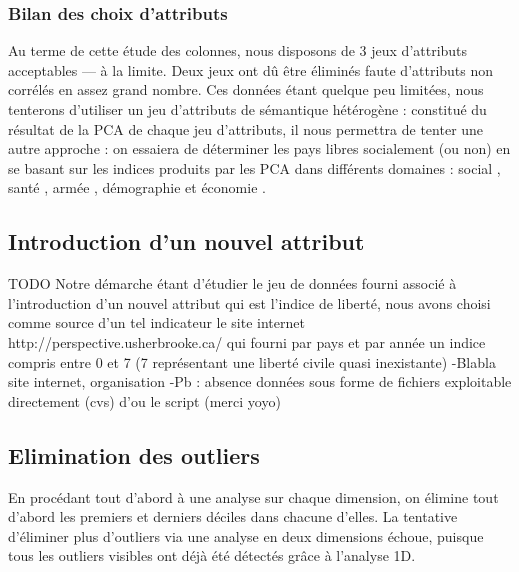 \subsubsection{Bilan des choix d'attributs}
Au terme de cette étude des colonnes, nous disposons de 3 jeux d'attributs acceptables --- à la limite. Deux jeux ont dû être éliminés faute d'attributs non corrélés en assez grand nombre. Ces données étant quelque peu limitées, nous tenterons d'utiliser un jeu d'attributs de sémantique hétérogène : constitué du résultat de la PCA de chaque jeu d'attributs, il nous permettra de tenter une autre approche : on essaiera de déterminer les pays libres socialement (ou non) en se basant sur les indices produits par les PCA dans différents domaines : \og social \fg, \og santé \fg, \og armée \fg, \og démographie \fg et \og économie \fg.


\subsection{Introduction d'un nouvel attribut}

{\huge TODO}
Notre démarche étant d'étudier le jeu de données fourni associé à l'introduction d'un nouvel attribut qui est l'indice de liberté, nous avons choisi comme source d'un tel indicateur le site internet \og http://perspective.usherbrooke.ca/ \fg qui fourni par pays et par année un indice compris entre 0 et 7 (7 représentant une liberté civile quasi inexistante)
-Blabla site internet, organisation
-Pb : absence données sous forme de fichiers exploitable directement (cvs) d'ou le script (merci yoyo)

\subsection{Elimination des outliers}
En procédant tout d'abord à une analyse sur chaque dimension, on élimine tout d'abord les premiers et derniers déciles dans chacune d'elles.
La tentative d'éliminer plus d'outliers via une analyse en deux dimensions échoue, puisque tous les outliers visibles ont déjà été détectés grâce à l'analyse 1D.

